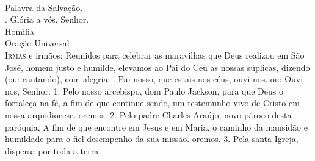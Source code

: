 \documentclass{book}
\begin{document}
\begin{flushleft}
    \vspace{.2cm} \\
    Palavra da Salvação. \\
    {\color{VioletRed2} \Rbar.} Glória a vós, Senhor.
    \vspace{.2cm} \\
    \textcolor{VioletRed2}{Homilia}
    \vspace{.2cm} \\
    \textcolor{VioletRed2}{Oração Universal}
    \vspace{.2cm} \\
    \lettrine[findent=2pt]{\color{VioletRed2}I}{rmãs} e irmãos:
    \newline
    Reunidos para celebrar as maravilhas que Deus realizou em São José,
    \newline
    homem justo e humilde,
    \newline
    elevamos ao Pai do Céu as nossas súplicas,
    \newline
    dizendo \textcolor{VioletRed2}{(ou:} cantando\textcolor{VioletRed2}{)}, com alegria:
    \vspace{.2cm}
    \newline
    {\color{VioletRed2} \Rbar.} Pai nosso, que estais nos céus, ouvi-nos.
    \newline
    \textcolor{VioletRed2}{ou:} Ouvi-nos, Senhor.
    \vspace{.2cm}
    \newline
    {\color{VioletRed2} 1.} Pelo nosso arcebispo, dom Paulo Jackson,
    \newline
    para que Deus o fortaleça na fé, a fim de que continue sendo,
    \newline
    um testemunho vivo de Cristo em nossa arquidiocese.
    \newline
    oremos.
    \vspace{.2cm}
    \newline
    {\color{VioletRed2} 2.} Pelo padre Charles Araújo, novo pároco desta paróquia,
    \newline
    A fim de que encontre em Jesus e em Maria,
    \newline
    o caminho da mansidão e humildade para o fiel desempenho da sua missão.
    \newline
    oremos.
    \vspace{.2cm}
    \newline
    {\color{VioletRed2} 3.} Pela santa Igreja, dispersa por toda a terra,
    \newline

\end{flushleft}
\end{document}
